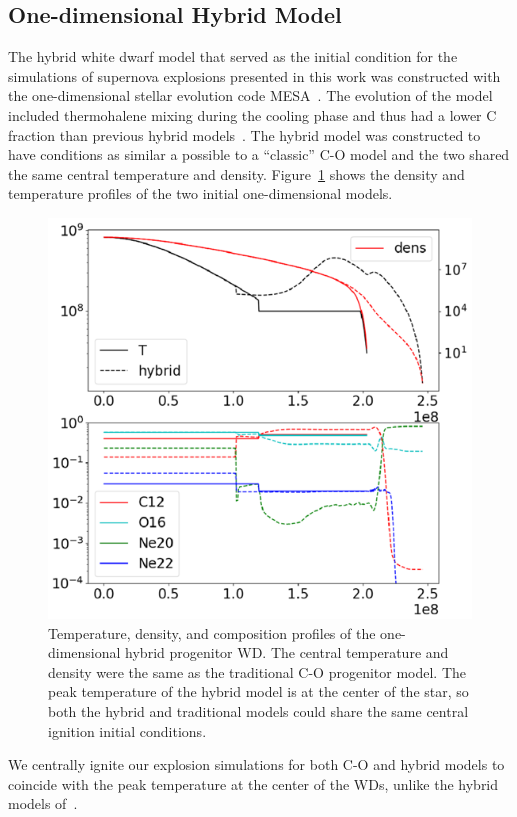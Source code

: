\documentclass[iop,apj]{emulateapj}
\begin{document}
\subsection{One-dimensional Hybrid Model}

The hybrid white dwarf model that served as the initial condition
for the simulations of supernova explosions presented in this work
was constructed with the one-dimensional stellar evolution code
MESA~\citep{mesa1,mesa2,mesa3,mesa3e}. The evolution of the model
included thermohalene mixing during the cooling phase and thus
had a lower C fraction than previous hybrid models~\citep{brooksetal2017}.
The hybrid model was constructed to have conditions as similar a possible
to a ``classic'' C-O model and the two shared the same central temperature
and density.  Figure~\ref{fig:init_conds} shows the density and temperature
profiles of the two initial one-dimensional models.
\begin{figure}
\includegraphics[width=\columnwidth]{figures/initial_conds.png}
\caption{\label{fig:init_conds}
Temperature, density, and  composition profiles of the one-dimensional hybrid
progenitor WD. The central temperature and density were the same as
the traditional C-O progenitor model.
The peak temperature of the hybrid model is at the center of the star,
so both the hybrid and traditional models could share the same
	central ignition initial conditions.
}
\end{figure}
We centrally ignite our explosion simulations for both C-O and hybrid
models to coincide with the peak temperature at the center of the WDs,
unlike the hybrid models of~\citet{willcoxetal2016}.
\end{document}
